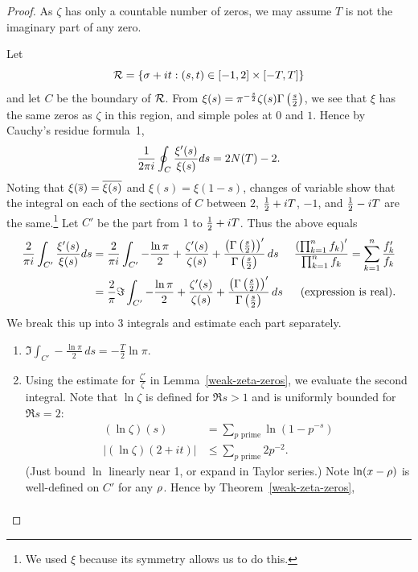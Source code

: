 \begin{proof}
As $\zeta$ has only a countable number of zeros, we may assume $T$ is not the imaginary part of any zero.

Let
\[
\cal R=\set{\si+it}{(s,t)\in [-1,2]\times [-T,T]}
\]
and let $C$ be the boundary of $\cal R$. 
From $\xi(s)=\pi^{-\frac s2}\zeta(s)\Ga\pf s2$, we see that $\xi$ has the same zeros as $\zeta$ in this region, and simple poles at $0$ and $1$. %
Hence by Cauchy's residue formula~1,
\[
\rc{2\pi i}\oint_{C} \frac{\xi'(s)}{\xi(s)} ds=2N(T)-2.
\]
Noting that $\xi(\ol{s})=\ol{\xi(s)}$ and $\xi(s)=\xi(1-s)$, changes of variable show that the integral on each of the sections of $C$ between $2$, $\rc 2+iT$, $-1$, and $\rc 2-iT$ are the same.\footnote{We used $\xi$ because its symmetry allows us to do this.} Let $C'$ be the part from $1$ to $\rc 2+iT$. Thus 
the above equals
\begin{align*}
\frac2{\pi i}\int_{C'} \frac{\xi'(s)}{\xi(s)} ds
&=\frac2{\pi i}
\int_{C'} -\frac{\ln \pi}{2}+\frac{\zeta'(s)}{\zeta(s)}+\frac{\pa{\Ga\pf{s}{2}}'}{\Ga\pf s2}\,ds&\frac{\pa{\prod_{k=1}^n f_k}'}{\prod_{k=1}^n f_k}=\sum_{k=1}^n \frac{f_k'}{f_k}\\
&=\frac2{\pi}\Im
\int_{C'} -\frac{\ln \pi}{2}+\frac{\zeta'(s)}{\zeta(s)}+\frac{\pa{\Ga\pf{s}{2}}'}{\Ga\pf s2}\,ds
&\text{(expression is real)}.
\end{align*}
We break this up into 3 integrals and estimate each part separately.
\begin{enumerate}
\item $\Im\int_{C'}-\frac{\ln \pi}{2}\,ds=-\frac{T}{2}\ln \pi$.
\item Using the estimate for $\frac{\zeta'}{\zeta}$ in Lemma~\ref{weak-zeta-zeros},  we evaluate the second integral. Note that $\ln\zeta$ is defined for $\Re s> 1$ and is uniformly bounded for $\Re s=2$:
\begin{align*}
(\ln\zeta)(s)&=\sum_{p\text{ prime}} \ln(1-p^{-s}) \\
|(\ln\zeta)(2+it)|&\le\sum_{p\text{ prime}} 2p^{-2}.
\end{align*}
(Just bound $\ln$ linearly near 1, or expand in Taylor series.)  
Note $\ln(x-\rh)$ is well-defined on $C'$ for any $\rh$. Hence by Theorem~\ref{weak-zeta-zeros},
\begin{align*}

\end{align*}
\end{enumerate}
\end{proof}
